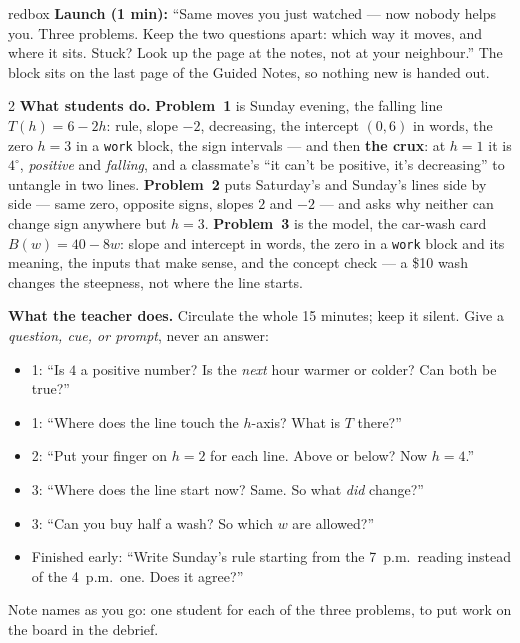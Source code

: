 \documentclass[10pt]{article}
\begin{document}
\begin{skillbox}{redbox}
\textbf{Launch (1 min):} ``Same moves you just watched --- now nobody helps you. Three problems.
Keep the two questions apart: which way it moves, and where it sits. Stuck? Look up the page at
the notes, not at your neighbour.'' The block sits on the last page of the Guided Notes, so nothing
new is handed out.
\begin{multicols}{2}
\textbf{What students do.} \textbf{Problem~1} is Sunday evening, the falling line $T(h)=6-2h$:
rule, slope $-2$, decreasing, the intercept $(0,6)$ in words, the zero $h=3$ in a \texttt{work}
block, the sign intervals --- and then \textbf{the crux}: at $h=1$ it is $4^\circ$, \emph{positive}
and \emph{falling}, and a classmate's ``it can't be positive, it's decreasing'' to untangle in two
lines. \textbf{Problem~2} puts Saturday's and Sunday's lines side by side --- same zero, opposite
signs, slopes $2$ and $-2$ --- and asks why neither can change sign anywhere but $h=3$.
\textbf{Problem~3} is the model, the car-wash card $B(w)=40-8w$: slope and intercept in words, the
zero in a \texttt{work} block and its meaning, the inputs that make sense, and the concept check
--- a \$10 wash changes the steepness, not where the line starts.

\columnbreak
\textbf{What the teacher does.} Circulate the whole 15 minutes; keep it silent. Give a
\emph{question, cue, or prompt}, never an answer:
\begin{itemize}[leftmargin=1.1em, nosep]
  \item 1: ``Is $4$ a positive number? Is the \emph{next} hour warmer or colder? Can both be
        true?''
  \item 1: ``Where does the line touch the $h$-axis? What is $T$ there?''
  \item 2: ``Put your finger on $h=2$ for each line. Above or below? Now $h=4$.''
  \item 3: ``Where does the line start now? Same. So what \emph{did} change?''
  \item 3: ``Can you buy half a wash? So which $w$ are allowed?''
  \item Finished early: ``Write Sunday's rule starting from the 7~p.m.\ reading instead of the
        4~p.m.\ one. Does it agree?''
\end{itemize}
Note names as you go: one student for each of the three problems, to put work on the board in the
debrief.
\end{multicols}
\end{skillbox}
\end{document}

